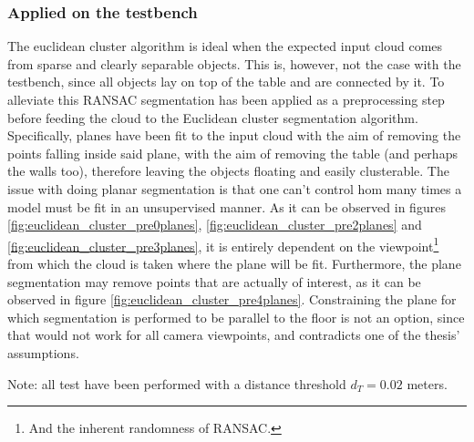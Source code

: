 \documentclass[../main.tex]{subfiles}
\begin{document}
\subsubsection{Applied on the testbench}
The euclidean cluster algorithm is ideal when the expected input cloud comes from sparse and clearly separable objects. This is, however, not the case with the testbench, since all objects lay on top of the table and are connected by it. To alleviate this RANSAC segmentation has been applied as a preprocessing step before feeding the cloud to the Euclidean cluster segmentation algorithm. Specifically, planes have been fit to the input cloud with the aim of removing the points falling inside said plane, with the aim of removing the table (and perhaps the walls too), therefore leaving the objects floating and easily clusterable. The issue with doing planar segmentation is that one can't control hom many times a model must be fit in an unsupervised manner. As it can be observed in figures \ref{fig:euclidean_cluster_pre0planes}, \ref{fig:euclidean_cluster_pre2planes} and \ref{fig:euclidean_cluster_pre3planes}, it is entirely dependent on the viewpoint\footnote{And the inherent randomness of RANSAC.} from which the cloud is taken where the plane will be fit. Furthermore, the plane segmentation may remove points that are actually of interest, as it can be observed in figure \ref{fig:euclidean_cluster_pre4planes}. Constraining the plane for which segmentation is performed to be parallel to the floor is not an option, since that would not work for all camera viewpoints, and contradicts one of the thesis' assumptions.

Note: all test have been performed with a distance threshold $d_{T}=0.02$ meters.
\end{document}
